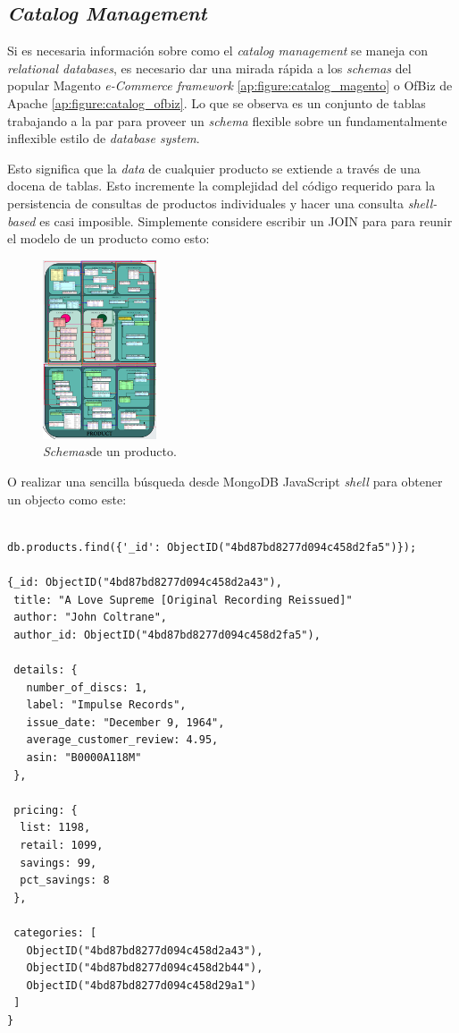 \subsection{\textit{Catalog Management}}

Si es necesaria información sobre como el \textit{catalog management} se maneja con \textit{relational databases}, es necesario dar una mirada rápida a los \textit{schemas} del popular Magento \textit{e-Commerce framework} \ref{ap:figure:catalog_magento} o OfBiz de Apache \ref{ap:figure:catalog_ofbiz}. Lo que se observa es un conjunto de tablas trabajando a la par para proveer un \textit{schema} flexible sobre un fundamentalmente inflexible estilo de \textit{database system}.

Esto significa que la \textit{data} de cualquier producto se extiende a través de una docena de tablas. Esto incremente la complejidad del código requerido para la persistencia de consultas de productos individuales y hacer una consulta \textit{shell-based} es casi imposible. Simplemente considere escribir un  JOIN para para reunir el modelo de un producto como esto:

\begin{figure}[h!]
	\centering
	\includegraphics[width=0.3\textwidth]{figuras/cap2/magento_product_schema.png}
	\caption{\textit{Schemas}de un producto.}
	\label{cap:figure:catalog_magento}
\end{figure}

O realizar una sencilla búsqueda desde MongoDB JavaScript \textit{shell} para obtener un objecto  como este:

\medskip
\begin{lstlisting}[caption= Busqueda en MongoDB]

db.products.find({'_id': ObjectID("4bd87bd8277d094c458d2fa5")});

{_id: ObjectID("4bd87bd8277d094c458d2a43"),
 title: "A Love Supreme [Original Recording Reissued]"
 author: "John Coltrane",
 author_id: ObjectID("4bd87bd8277d094c458d2fa5"),

 details: {
   number_of_discs: 1,
   label: "Impulse Records",
   issue_date: "December 9, 1964",
   average_customer_review: 4.95,
   asin: "B0000A118M"
 },

 pricing: {
  list: 1198,
  retail: 1099,
  savings: 99,
  pct_savings: 8
 },

 categories: [
   ObjectID("4bd87bd8277d094c458d2a43"),
   ObjectID("4bd87bd8277d094c458d2b44"),
   ObjectID("4bd87bd8277d094c458d29a1")
 ]
}
\end{lstlisting}

